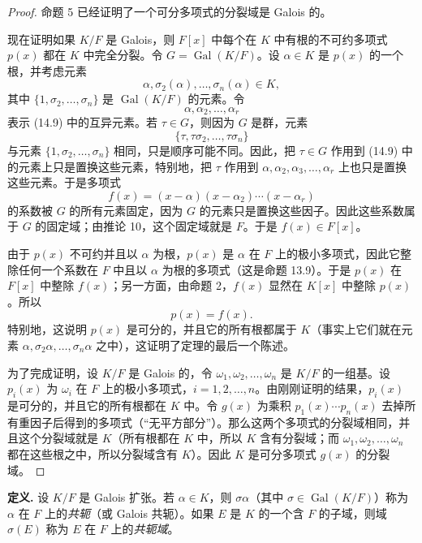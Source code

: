 \begin{proof}
命题 5 已经证明了一个可分多项式的分裂域是 Galois 的。

现在证明如果 $K/F$ 是 Galois，则 $F[x]$ 中每个在 $K$ 中有根的不可约多项式 $p(x)$ 都在 $K$ 中完全分裂。令 $G=\operatorname{Gal}(K/F)$。设 $\alpha\in K$ 是 $p(x)$ 的一个根，并考虑元素
\begin{equation}
\alpha,\sigma_2(\alpha),\ldots,\sigma_n(\alpha)\in K,
\tag{14.9}
\end{equation}
其中 $\{1,\sigma_2,\ldots,\sigma_n\}$ 是 $\operatorname{Gal}(K/F)$ 的元素。令
\[
\alpha,\alpha_2,\ldots,\alpha_r
\]
表示 (14.9) 中的互异元素。若 $\tau\in G$，则因为 $G$ 是群，元素
\[
\{\tau,\tau\sigma_2,\ldots,\tau\sigma_n\}
\]
与元素 $\{1,\sigma_2,\ldots,\sigma_n\}$ 相同，只是顺序可能不同。因此，把 $\tau\in G$ 作用到 (14.9) 中的元素上只是置换这些元素，特别地，把 $\tau$ 作用到 $\alpha,\alpha_2,\alpha_3,
\ldots,
\alpha_r$ 上也只是置换这些元素。于是多项式
\[
f(x)=(x-\alpha)(x-\alpha_2)\cdots(x-\alpha_r)
\]
的系数被 $G$ 的所有元素固定，因为 $G$ 的元素只是置换这些因子。因此这些系数属于 $G$ 的固定域；由推论 10，这个固定域就是 $F$。于是 $f(x)\in F[x]$。

由于 $p(x)$ 不可约并且以 $\alpha$ 为根，$p(x)$ 是 $\alpha$ 在 $F$ 上的极小多项式，因此它整除任何一个系数在 $F$ 中且以 $\alpha$ 为根的多项式（这是命题 13.9）。于是 $p(x)$ 在 $F[x]$ 中整除 $f(x)$；另一方面，由命题 2，$f(x)$ 显然在 $K[x]$ 中整除 $p(x)$。所以
\[
p(x)=f(x).
\]
特别地，这说明 $p(x)$ 是可分的，并且它的所有根都属于 $K$（事实上它们就在元素 $\alpha,
\sigma_2\alpha,
\ldots,
\sigma_n\alpha$ 之中），这证明了定理的最后一个陈述。

为了完成证明，设 $K/F$ 是 Galois 的，令 $\omega_1,\omega_2,
\ldots,
\omega_n$ 是 $K/F$ 的一组基。设 $p_i(x)$ 为 $\omega_i$ 在 $F$ 上的极小多项式，$i=1,2,
\ldots,n$。由刚刚证明的结果，$p_i(x)$ 是可分的，并且它的所有根都在 $K$ 中。令 $g(x)$ 为乘积 $p_1(x)\cdots p_n(x)$ 去掉所有重因子后得到的多项式（“无平方部分”）。那么这两个多项式的分裂域相同，并且这个分裂域就是 $K$（所有根都在 $K$ 中，所以 $K$ 含有分裂域；而 $\omega_1,
\omega_2,
\ldots,
\omega_n$ 都在这些根之中，所以分裂域含有 $K$）。因此 $K$ 是可分多项式 $g(x)$ 的分裂域。
\end{proof}

\noindent\textbf{定义.} 设 $K/F$ 是 Galois 扩张。若 $\alpha\in K$，则 $\sigma\alpha$（其中 $\sigma\in\operatorname{Gal}(K/F)$）称为 $\alpha$ 在 $F$ 上的\emph{共轭}（或 Galois 共轭）。如果 $E$ 是 $K$ 的一个含 $F$ 的子域，则域 $\sigma(E)$ 称为 $E$ 在 $F$ 上的\emph{共轭域}。


